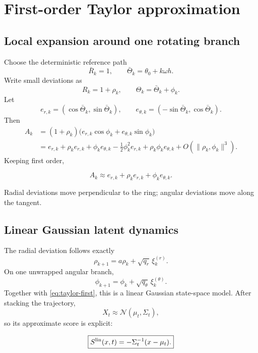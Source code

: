 \documentclass[11pt,a4paper]{article}
\newcommand{\N}{\mathcal{N}}
\begin{document}
\section{First-order Taylor approximation}

\subsection{Local expansion around one rotating branch}

Choose the deterministic reference path
\[
 \bar R_k=1,
 \qquad
 \bar\Theta_k=\theta_0+k\omega h.
\]
Write small deviations as
\[
 R_k=1+\rho_k,
 \qquad
 \Theta_k=\bar\Theta_k+\phi_k.
\]
Let
\[
 e_{r,k}=(\cos\bar\Theta_k,\sin\bar\Theta_k),
 \qquad
 e_{\theta,k}=(-\sin\bar\Theta_k,\cos\bar\Theta_k).
\]
Then
\begin{align}
 A_k
 &=(1+\rho_k)
 \big(e_{r,k}\cos\phi_k+e_{\theta,k}\sin\phi_k\big)\\
 &=e_{r,k}+\rho_ke_{r,k}+\phi_ke_{\theta,k}
 -\frac12\phi_k^2e_{r,k}+\rho_k\phi_ke_{\theta,k}+O(\|\rho_k,\phi_k\|^3).
 \label{eq:taylor-full}
\end{align}
Keeping first order,
\begin{keyresult}
\begin{equation}
 \boxed{A_k\approx e_{r,k}+\rho_ke_{r,k}+\phi_ke_{\theta,k}.}
 \label{eq:taylor-first}
\end{equation}
\end{keyresult}
Radial deviations move perpendicular to the ring; angular deviations move along the tangent.

\subsection{Linear Gaussian latent dynamics}

The radial deviation follows exactly
\begin{equation}
 \rho_{k+1}=a\rho_k+\sqrt{q_r}\,\xi_k^{(r)}.
 \label{eq:rho-ar1}
\end{equation}
On one unwrapped angular branch,
\begin{equation}
 \phi_{k+1}=\phi_k+\sqrt{q_\theta}\,\xi_k^{(\theta)}.
 \label{eq:phi-rw}
\end{equation}
Together with \cref{eq:taylor-first}, this is a linear Gaussian state-space model. After stacking the trajectory,
\begin{equation}
 X_t\approx\N(\mu_t,\Sigma_t),
\end{equation}
so its approximate score is explicit:
\begin{keyresult}
\begin{equation}
 \boxed{S^{\rm lin}(x,t)=-\Sigma_t^{-1}(x-\mu_t).}
 \label{eq:linear-score}
\end{equation}
\end{keyresult}
\end{document}
